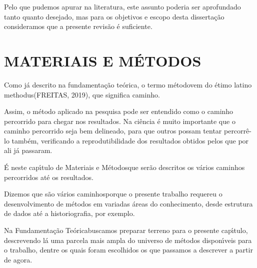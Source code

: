 \documentclass[
12pt,		%
openright,	%
twoside,  %
a4paper,			%
chapter=TITLE,		%
english,			%
french,				%
spanish,			%
brazil				%
]{USPSC-classe/USPSC_RedarTex}
\begin{document}
Pelo que pudemos apurar na literatura, este assunto poderia ser aprofundado tanto quanto desejado, mas para os objetivos e escopo desta disserta\c{c}\~ao consideramos que a presente revis\~ao \'e suficiente.










\chapter[MATERIAIS E M\'ETODOS]{MATERIAIS E M\'ETODOS}\label{MATERIAIS E M\'ETODOS}
Como j\'a descrito na fundamenta\c{c}\~ao te\'orica, o termo \textquotedbl m\'etodo\textquotedbl  vem do \'etimo latino \textquotedbl methodus\textquotedbl   (FREITAS, 2019), que significa \textquotedbl caminho\textquotedbl .










Assim, o m\'etodo aplicado na pesquisa pode ser entendido como o caminho percorrido para chegar nos resultados. Na ci\^encia \'e muito importante que o caminho percorrido seja bem delineado, para que outros possam tentar percorr\^e-lo tamb\'em, verificando a reprodutibilidade dos resultados obtidos pelos que por ali j\'a passaram.










\'E neste cap\'{\i}tulo de \textquotedbl Materiais e M\'etodos\textquotedbl  que ser\~ao descritos os v\'arios caminhos percorridos at\'e os resultados.










Dizemos que s\~ao \textquotedbl v\'arios caminhos\textquotedbl  porque o presente trabalho requereu o desenvolvimento de m\'etodos em variadas \'areas do conhecimento, desde estrutura de dados at\'e a historiografia, por exemplo.










Na \textquotedbl Fundamenta\c{c}\~ao Te\'orica\textquotedbl  buscamos preparar terreno para o presente cap\'{\i}tulo, descrevendo l\'a uma parcela mais ampla do universo de m\'etodos dispon\'{\i}veis para o trabalho, dentre os quais foram escolhidos os que passamos a descrever a partir de agora.
\end{document}
